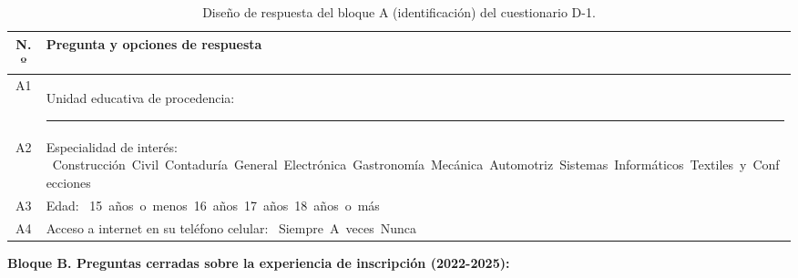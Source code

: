 \begin{table}[H]
    \centering
    \caption{Diseño de respuesta del bloque A (identificación) del cuestionario D-1.}
    \label{tab:d1_identificacion}
    \renewcommand{\arraystretch}{1.60}
    \begin{tabularx}{\textwidth}{c L}
        \toprule
        \textbf{N.º} & \textbf{Pregunta y opciones de respuesta} \\
        \midrule
        A1 & Unidad educativa de procedencia: \rule[-2pt]{4.5cm}{0.4pt} \\
        \addlinespace
        A2 & Especialidad de interés: \mbox{\casilla{} Construcción Civil}\quad \mbox{\casilla{} Contaduría General}\quad \mbox{\casilla{} Electrónica}\quad \mbox{\casilla{} Gastronomía}\quad \mbox{\casilla{} Mecánica Automotriz}\quad \mbox{\casilla{} Sistemas Informáticos}\quad \mbox{\casilla{} Textiles y Confecciones} \\
        \addlinespace
        A3 & Edad: \mbox{\casilla{} 15 años o menos}\quad \mbox{\casilla{} 16 años}\quad \mbox{\casilla{} 17 años}\quad \mbox{\casilla{} 18 años o más} \\
        \addlinespace
        A4 & Acceso a internet en su teléfono celular: \mbox{\casilla{} Siempre}\quad \mbox{\casilla{} A veces}\quad \mbox{\casilla{} Nunca} \\
        \bottomrule
    \end{tabularx}
\end{table}

\Needspace{15cm}
\noindent\textbf{Bloque B. Preguntas cerradas sobre la experiencia de inscripción (2022-2025):}

